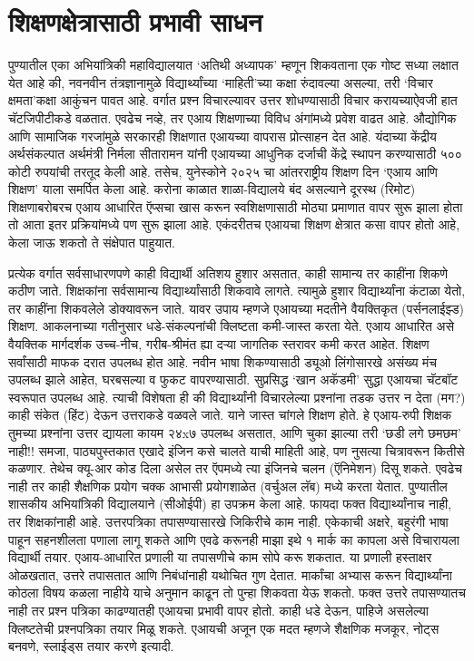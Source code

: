 \chapter{शिक्षणक्षेत्रासाठी प्रभावी साधन}

पुण्यातील एका अभियांत्रिकी महाविद्यालयात `अतिथी अध्यापक' म्हणून शिकवताना एक गोष्ट सध्या लक्षात येत आहे की, नवनवीन तंत्रज्ञानामुळे विद्यार्थ्यांच्या `माहिती'च्या कक्षा रुंदावल्या असल्या, तरी `विचार क्षमता'कक्षा आकुंचन पावत आहे. वर्गात प्रश्न विचारल्यावर उत्तर शोधण्यासाठी विचार करायच्याऐवजी हात चॅटजिपीटीकडे वळतात. एवढेच नव्हे, तर एआय शिक्षणाच्या विविध अंगांमध्ये प्रवेश वाढत आहे. औद्योगिक आणि सामाजिक गरजांमुळे सरकारही शिक्षणात एआयच्या वापरास प्रोत्साहन देत आहे.  यंदाच्या केंद्रीय अर्थसंकल्पात अर्थमंत्री निर्मला सीतारामन यांनी एआयच्या आधुनिक दर्जाची केंद्रे स्थापन करण्यासाठी ५०० कोटी रुपयांची तरतूद केली आहे. तसेच, युनेस्कोने २०२५ चा आंतरराष्ट्रीय शिक्षण दिन `एआय आणि शिक्षण' याला समर्पित केला आहे. करोना काळात शाळा-विद्यालये बंद असल्याने दूरस्थ (रिमोट) शिक्षणाबरोबरच एआय आधारित ऍप्सचा खास करून स्वशिक्षणासाठी मोठ्या प्रमाणात वापर सुरू झाला होता तो आता इतर प्रक्रियांमध्ये पण सुरू झाला आहे. एकंदरीतच एआयचा शिक्षण क्षेत्रात कसा वापर होतो आहे, केला जाऊ शकतो ते संक्षेपात पाहुयात.

प्रत्येक वर्गात सर्वसाधारणपणे काही विद्यार्थी अतिशय हुशार असतात, काही सामान्य तर काहींना शिकणे कठीण जाते. शिक्षकांना सर्वसामान्य विद्यार्थ्यांसाठी शिकवावे लागते. त्यामुळे हुशार विद्यार्थ्यांना कंटाळा येतो, तर काहींना शिकवलेले डोक्यावरून जाते. यावर उपाय म्हणजे एआयच्या मदतीने वैयक्तिकृत (पर्सनलाईझ्ड) शिक्षण. आकलनाच्या गतीनुसार धडे-संकल्पनांची क्लिष्टता कमी-जास्त करता येते. एआय आधारित असे वैयक्तिक मार्गदर्शक उच्च-नीच, गरीब-श्रीमंत ह्या दऱ्या जागतिक स्तरावर कमी करत आहेत. शिक्षण सर्वांसाठी माफक दरात उपलब्ध होत आहे.  नवीन भाषा शिकण्यासाठी ड्यूओ लिंगोसारखे असंख्य मंच उपलब्ध झाले आहेत, घरबसल्या व फुकट वापरण्यासाठी. सुप्रसिद्ध `खान अकॅडमी' सुद्धा एआयचा चॅटबॉट स्वरूपात उपलब्ध आहे. त्याची विशेषता ही की विद्यार्थ्यांनी विचारलेल्या प्रश्नांना तडक उत्तर न देता (मग?) काही संकेत (हिंट) देऊन उत्तराकडे वळवले जाते. याने जास्त चांगले शिक्षण होते. हे एआय-रुपी शिक्षक तुमच्या प्रश्नांना उत्तर द्यायला कायम २४x७ उपलब्ध असतात, आणि चुका झाल्या तरी `छडी लगे छमछम' नाही!!  समजा, पाठ्यपुस्तकात एखादे इंजिन कसे चालते याची माहिती आहे, पण नुसत्या चित्रावरून कितीसे कळणार. तेथेच क्यू-आर कोड दिला असेल तर ऍपमध्ये त्या इंजिनचे चलन (ऍनिमेशन) दिसू शकते. एवढेच नाही तर काही शैक्षणिक प्रयोग चक्क आभासी प्रयोगशाळेत (वर्चुअल लॅब) मध्ये करता येतात. पुण्यातील शासकीय अभियांत्रिकी विद्यालयाने (सीओईपी) हा उपक्रम केला आहे. फायदा फक्त विद्यार्थ्यांनाच नाही, तर शिक्षकांनाही आहे. उत्तरपत्रिका तपासण्यासारखे जिकिरीचे काम नाही. एकेकाची अक्षरे, बहुरंगी भाषा पाहून सहनशीलता पणाला लागू शकते आणि एवढे करूनही माझा इथे १ मार्क का कापला असे विचारायला विद्यार्थी तयार. एआय-आधारित प्रणाली या तपासणीचे काम सोपे करू शकतात. या प्रणाली हस्ताक्षर ओळखतात, उत्तरे तपासतात आणि निबंधांनाही यथोचित गुण देतात. मार्कांचा अभ्यास करून विद्यार्थ्यांना कोठला विषय कळला नाहीये याचे अनुमान काढून तो पुन्हा शिकवता येऊ शकतो. फक्त उत्तरे तपासण्यातच नाही तर प्रश्न पत्रिका काढण्यातही एआयचा प्रभावी वापर होतो. काही धडे देऊन, पाहिजे असलेल्या क्लिष्टतेची प्रश्नपत्रिका तयार मिळू शकते. एआयची अजून एक मदत म्हणजे शैक्षणिक मजकूर, नोट्स बनवणे, स्लाईड्स तयार करणे इत्यादी.

